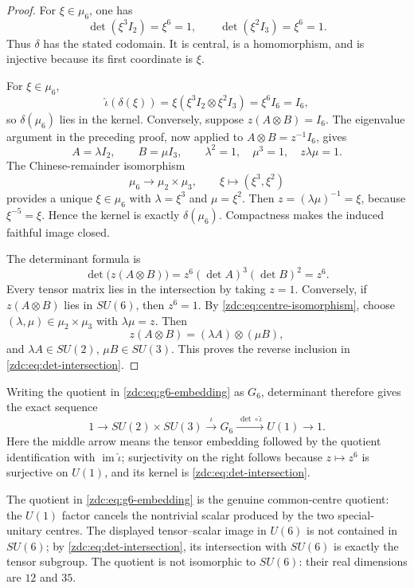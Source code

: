 \begin{proof}
For $\xi\in\mu_6$, one has
\[
 \det(\xi^3I_2)=\xi^6=1,
 \qquad
 \det(\xi^2I_3)=\xi^6=1.
\]
Thus $\delta$ has the stated codomain.  It is central, is a homomorphism,
and is injective because its first coordinate is $\xi$.

For $\xi\in\mu_6$,
\[
 \widehat\iota(\delta(\xi))
 =\xi(\xi^3I_2\otimes\xi^2I_3)
 =\xi^6I_6=I_6,
\]
so \(\delta(\mu_6)\) lies in the kernel.  Conversely, suppose
\(z(A\otimes B)=I_6\).  The eigenvalue argument in the preceding proof,
now applied to $A\otimes B=z^{-1}I_6$, gives
\[
 A=\lambda I_2,\qquad B=\mu I_3,\qquad
 \lambda^2=1,\quad\mu^3=1,\quad z\lambda\mu=1.
\]
The Chinese-remainder isomorphism
\[
 \mu_6\longrightarrow\mu_2\times\mu_3,
 \qquad \xi\longmapsto(\xi^3,\xi^2)
\]
provides a unique $\xi\in\mu_6$ with
\(\lambda=\xi^3\) and $\mu=\xi^2$.  Then
\(z=(\lambda\mu)^{-1}=\xi\), because $\xi^{-5}=\xi$.  Hence the kernel
is exactly \(\delta(\mu_6)\).  Compactness makes the induced faithful image
closed.

The determinant formula is
\[
 \det\bigl(z(A\otimes B)\bigr)
 =z^6(\det A)^3(\det B)^2=z^6.
\]
Every tensor matrix lies in the intersection by taking $z=1$.  Conversely,
if $z(A\otimes B)$ lies in $SU(6)$, then $z^6=1$.  By
\eqref{zdc:eq:centre-isomorphism}, choose
\((\lambda,\mu)\in\mu_2\times\mu_3\) with $\lambda\mu=z$.  Then
\[
 z(A\otimes B)=(\lambda A)\otimes(\mu B),
\]
and $\lambda A\in SU(2)$, $\mu B\in SU(3)$.  This proves the reverse
inclusion in \eqref{zdc:eq:det-intersection}.
\end{proof}

Writing the quotient in \eqref{zdc:eq:g6-embedding} as $G_6$, determinant
therefore gives the exact sequence
\[
 1\longrightarrow SU(2)\times SU(3)
 \xrightarrow{\ \iota\ }G_6
 \xrightarrow{\ \det\circ\widehat\iota\ }U(1)
 \longrightarrow1.
\]
Here the middle arrow means the tensor embedding followed by the quotient
identification with $\operatorname{im}\widehat\iota$; surjectivity on the
right follows because $z\mapsto z^6$ is surjective on $U(1)$, and its kernel
is \eqref{zdc:eq:det-intersection}.

The quotient in \eqref{zdc:eq:g6-embedding} is the genuine common-centre
quotient: the $U(1)$ factor cancels the nontrivial scalar produced by the
two special-unitary centres.  The displayed tensor--scalar image in $U(6)$
is not contained in $SU(6)$; by \eqref{zdc:eq:det-intersection}, its
intersection with $SU(6)$ is exactly the tensor subgroup.  The quotient is
not isomorphic to $SU(6)$: their real dimensions are $12$ and $35$.

